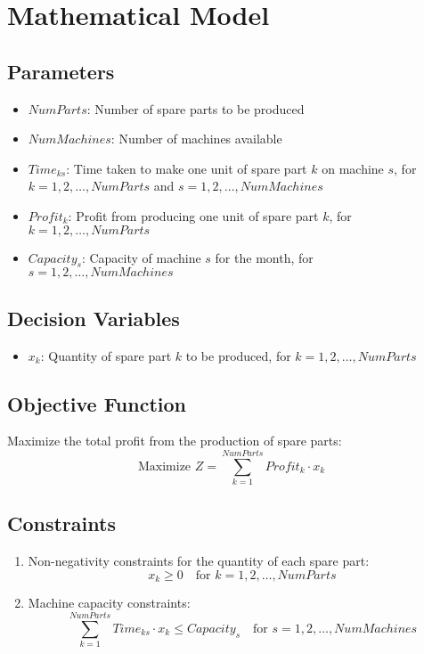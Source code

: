 \documentclass{article}
\begin{document}
\section*{Mathematical Model}

\subsection*{Parameters}
\begin{itemize}
    \item $NumParts$: Number of spare parts to be produced
    \item $NumMachines$: Number of machines available
    \item $Time_{ks}$: Time taken to make one unit of spare part $k$ on machine $s$, for $k = 1, 2, \ldots, NumParts$ and $s = 1, 2, \ldots, NumMachines$
    \item $Profit_k$: Profit from producing one unit of spare part $k$, for $k = 1, 2, \ldots, NumParts$
    \item $Capacity_s$: Capacity of machine $s$ for the month, for $s = 1, 2, \ldots, NumMachines$
\end{itemize}

\subsection*{Decision Variables}
\begin{itemize}
    \item $x_k$: Quantity of spare part $k$ to be produced, for $k = 1, 2, \ldots, NumParts$
\end{itemize}

\subsection*{Objective Function}
Maximize the total profit from the production of spare parts:
\[
\text{Maximize } Z = \sum_{k=1}^{NumParts} Profit_k \cdot x_k
\]

\subsection*{Constraints}
\begin{enumerate}
    \item Non-negativity constraints for the quantity of each spare part:
    \[
    x_k \geq 0 \quad \text{for } k = 1, 2, \ldots, NumParts
    \]
    \item Machine capacity constraints:
    \[
    \sum_{k=1}^{NumParts} Time_{ks} \cdot x_k \leq Capacity_s \quad \text{for } s = 1, 2, \ldots, NumMachines
    \]
\end{enumerate}
\end{document}
